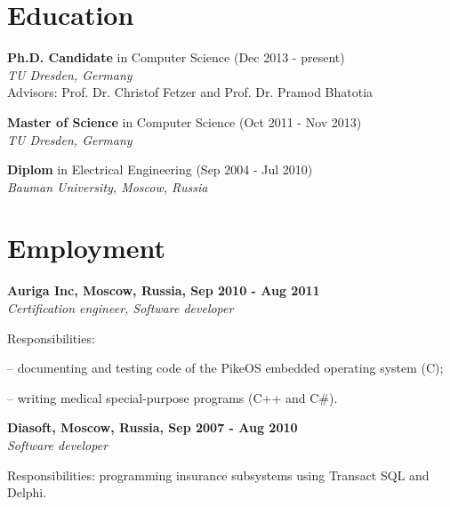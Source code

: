 \documentclass[letterpaper]{article}
\renewenvironment{itemize}{
  \begin{list}{}{
    \setlength{\leftmargin}{1.5em}
  }
}{
  \end{list}
}
\begin{document}
\section*{Education}

\begin{itemize}

 \item \textbf{Ph.D. Candidate} in Computer Science (Dec 2013 - present)\\
 {\em  TU Dresden, Germany}\\
Advisors: Prof. Dr. Christof Fetzer and Prof. Dr. Pramod Bhatotia

 \item \textbf{Master of Science} in Computer Science (Oct 2011 - Nov 2013) \\
 {\em  TU Dresden, Germany}

\item \textbf{Diplom} in Electrical Engineering (Sep 2004 - Jul 2010)\\
  {\em Bauman University, Moscow, Russia} 

\end{itemize}



\section*{Employment}

{\bf Auriga Inc, Moscow, Russia, Sep 2010 - Aug 2011}\\
{\em Certification engineer, Software developer}
\begin{itemize}
	\item Responsibilities:
		\begin{itemize}
		\item -- documenting and testing code of the PikeOS embedded operating system (C);
		\item -- writing medical special-purpose programs (C++ and C\#).
		\end{itemize}
	\item 
\end{itemize}

\vspace{-2mm}

{\bf Diasoft, Moscow, Russia, Sep 2007 - Aug 2010}\\
{\em Software developer}
\begin{itemize}
	\item Responsibilities: programming insurance subsystems using Transact SQL and Delphi.
\end{itemize}
\end{document}
